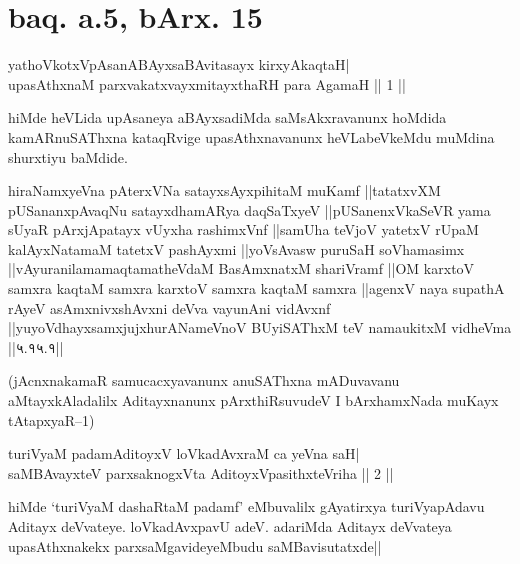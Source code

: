 \eject

\section*{baq. a.5, bArx. 15}


\begin{shl}
yathoVkotxVpAsanABAyxsaBAvitasayx kirxyAkaqtaH| \\
upasAthxnaM parxvakatxvayxmitayxthaRH para AgamaH \hfill||  1 || 
\end{shl}

\begin{artha} 
hiMde heVLida upAsaneya aBAyxsadiMda saMsAkxravanunx hoMdida 
kamARnuSAThxna kataqRvige upasAthxnavanunx heVLabeVkeMdu muMdina 
shurxtiyu baMdide.\\
\begin{shl}
hiraNamxyeVna pAterxVNa satayxsAyxpihitaM muKamf ||tatatxvXM pUSananxpAvaqNu satayxdhamARya daqSaTxyeV ||pUSanenxVkaSeVR yama sUyaR pArxjApatayx vUyxha rashimxVnf ||samUha teVjoV yatetxV rUpaM kalAyxNatamaM tatetxV pashAyxmi ||yoV\s sAvasw puruSaH soV\s hamasimx ||vAyuranilamamaqtamatheVdaM BasAmxnatxM shariVramf ||OM karxtoV samxra kaqtaM samxra karxtoV samxra kaqtaM samxra ||agenxV naya supathA rAyeV asAmxnivxshAvxni deVva vayunAni vidAvxnf ||yuyoVdhayxsamxjujxhurANameVnoV BUyiSAThxM teV namaukitxM vidheVma ||५.१५.१||
\end{shl}
(jAcnxnakamaR samucacxyavanunx anuSAThxna mADuvavanu aMtayxkAladalilx 
Aditayxnanunx pArxthiRsuvudeV I bArxhamxNada muKayx tAtapxyaR--1)
\end{artha}


\begin{shl}
turiVyaM padamAditoyxV loVkadAvxraM ca yeVna saH| \\
saMBAvayxteV parxsaknogxV\s ta AditoyxVpasithxteVriha \hfill||  2 || 
\end{shl}

\begin{artha} 
hiMde `turiVyaM dashaRtaM padamf' eMbuvalilx gAyatirxya turiVyapAdavu 
Aditayx deVvateye. loVkadAvxpavU adeV. adariMda Aditayx deVvateya 
upasAthxnakekx parxsaMgavideyeMbudu saMBavisutatxde||
\end{artha}

